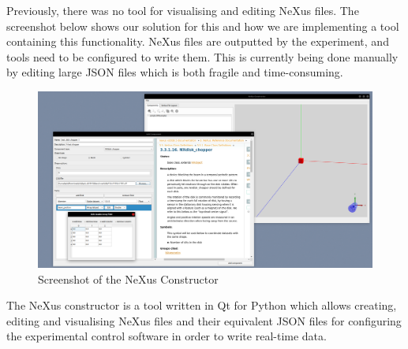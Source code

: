 
Previously, there was no tool for visualising and editing NeXus files. The screenshot below shows our solution for this and how we are implementing a tool containing this functionality. NeXus files are outputted by the experiment, and tools need to be configured to write them. This is currently being done manually by editing large JSON files which is both fragile and time-consuming.

\begin{figure}
\caption{Screenshot of the NeXus Constructor}
\includegraphics[width=\linewidth]{screenshot.png}
\end{figure}

The NeXus constructor is a tool written in Qt for Python which allows creating, editing and visualising NeXus files and their equivalent JSON files for configuring the experimental control software in order to write real-time data. 
